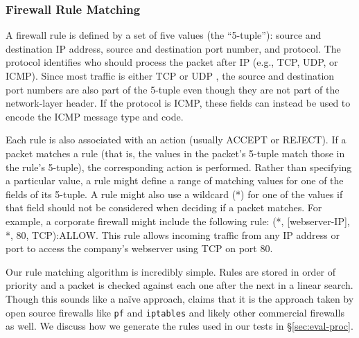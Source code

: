 
\subsubsection{Firewall Rule Matching}

A firewall rule is defined by a set of five values (the ``5-tuple''): source
and destination IP address, source and destination port number, and protocol.
The protocol identifies who should process the packet after IP (e.g., TCP, UDP,
or ICMP). Since most traffic is either TCP or UDP \cite{thompson1997wide}, the source and
destination port numbers are also part of the 5-tuple even though they are not
part of the network-layer header. If the protocol is ICMP, these fields can
instead be used to encode the ICMP message type and code.

Each rule is also associated with an action (usually ACCEPT or REJECT). If a
packet matches a rule (that is, the values in the packet's 5-tuple match those
in the rule's 5-tuple), the corresponding action is performed. Rather than
specifying a particular value, a rule might define a range of matching values
for one of the fields of its 5-tuple. A rule might also use a wildcard (*) for
one of the values if that field should not be considered when deciding if a
packet matches. For example, a corporate firewall might include the following
rule: (*, [webserver-IP], *, 80, TCP):ALLOW. This rule allows incoming traffic
from any IP address or port to access the company's webserver using TCP on port
80.

Our rule matching algorithm is incredibly simple. Rules are stored in order of
priority and a packet is checked against each one after the next in a linear
search. Though this sounds like a na\"{i}ve approach, \cite{Rovniagin} claims
that it is the approach taken by open source firewalls like \texttt{pf} and
\texttt{iptables} and likely other commercial firewalls as well. We discuss how
we generate the rules used in our tests in \S\ref{sec:eval-proc}.
